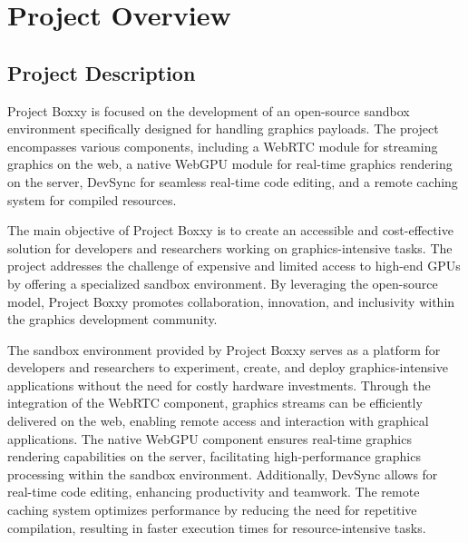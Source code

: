 
\chapter{Project Overview} %

\label{Chapter1} %



\section{Project Description}

Project Boxxy is focused on the development of an open-source sandbox environment specifically designed for handling graphics payloads.
The project encompasses various components, including a WebRTC module for streaming graphics on the web, a native WebGPU module for real-time graphics rendering on the server, DevSync for seamless real-time code editing, and a remote caching system for compiled resources.

The main objective of Project Boxxy is to create an accessible and cost-effective solution for developers and researchers working on graphics-intensive tasks.
The project addresses the challenge of expensive and limited access to high-end GPUs by offering a specialized sandbox environment.
By leveraging the open-source model, Project Boxxy promotes collaboration, innovation, and inclusivity within the graphics development community.

The sandbox environment provided by Project Boxxy serves as a platform for developers and researchers to experiment, create, and deploy graphics-intensive applications without the need for costly hardware investments.
Through the integration of the WebRTC component, graphics streams can be efficiently delivered on the web, enabling remote access and interaction with graphical applications.
The native WebGPU component ensures real-time graphics rendering capabilities on the server, facilitating high-performance graphics processing within the sandbox environment.
Additionally, DevSync allows for real-time code editing, enhancing productivity and teamwork.
The remote caching system optimizes performance by reducing the need for repetitive compilation, resulting in faster execution times for resource-intensive tasks.


